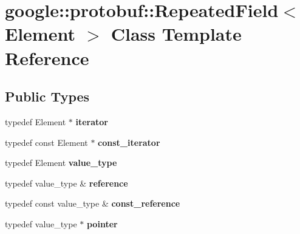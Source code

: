 \hypertarget{classgoogle_1_1protobuf_1_1RepeatedField}{}\section{google\+:\+:protobuf\+:\+:Repeated\+Field$<$ Element $>$ Class Template Reference}
\label{classgoogle_1_1protobuf_1_1RepeatedField}
\subsection*{Public Types}
\begin{DoxyCompactItemize}
\item 
\mbox{\label{classgoogle_1_1protobuf_1_1RepeatedField_afe09465b67f0342d6ce7dc91db798730}} 
typedef Element $\ast$ {\bfseries iterator}
\item 
\mbox{\label{classgoogle_1_1protobuf_1_1RepeatedField_ac1b246f4f6e0f7041b140cda573d91b0}} 
typedef const Element $\ast$ {\bfseries const\+\_\+iterator}
\item 
\mbox{\label{classgoogle_1_1protobuf_1_1RepeatedField_a09797dc6e6bab6af56940342cdd026fb}} 
typedef Element {\bfseries value\+\_\+type}
\item 
\mbox{\label{classgoogle_1_1protobuf_1_1RepeatedField_a74b47a230c833d45e0ee342d3774c8db}} 
typedef value\+\_\+type \& {\bfseries reference}
\item 
\mbox{\label{classgoogle_1_1protobuf_1_1RepeatedField_a859f4eb9df20e25721f12243d25ef1ef}} 
typedef const value\+\_\+type \& {\bfseries const\+\_\+reference}
\item 
\mbox{\label{classgoogle_1_1protobuf_1_1RepeatedField_af36876592ed70ee7459bc178f975665d}} 
typedef value\+\_\+type $\ast$ {\bfseries pointer}
\item 
\mbox{\label{classgoogle_1_1protobuf_1_1RepeatedField_a2e73ab7afa52dfd2249344006ea1be73}} 

\end{DoxyCompactItemize}
